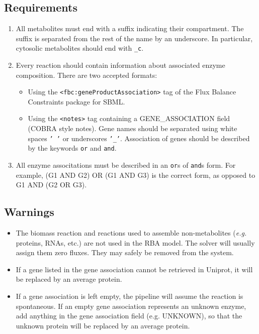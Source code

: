 \subsection{Requirements}
\begin{enumerate}
\item All metabolites must end with a suffix indicating their compartment.
The suffix is separated from the rest of the name by an underscore.
In particular, cytosolic metabolites should end with \texttt{\_c}.
\item Every reaction should contain information about associated enzyme composition.
There are two accepted formats:
  \begin{itemize}
  \item Using the \texttt{<fbc:geneProductAssociation>} tag of the Flux Balance Constraints package for SBML.
  \item Using the \texttt{<notes>} tag containing a GENE\_ASSOCIATION field (COBRA style notes).
  Gene names should be separated using white spaces \texttt{' '} or underscores \texttt{'\_'}.
  Association of genes should be described by the keywords \texttt{or} and \texttt{and}.
  \end{itemize}
\item All enzyme associtations must be described in an \texttt{or}s of \texttt{and}s form.
For example, (G1 AND G2) OR (G1 AND G3) is the correct form,
as opposed to G1 AND (G2 OR G3).
\end{enumerate}

\subsection{Warnings}
\begin{itemize}
\item The biomass reaction and reactions used to assemble non-metabolites
(\textit{e.g.} proteins, RNAs, etc.) are not used in the RBA model.
The solver will usually assign them zero fluxes.
They may safely be removed from the system.
\item If a gene listed in the gene association cannot be retrieved in Uniprot,
it will be replaced by an average protein.
\item If a gene association is left empty, the pipeline will assume the reaction is spontaneous.
If an empty gene association represents an unknown enzyme,
add anything in the gene association field (e.g. UNKNOWN),
so that the unknown protein will be replaced by an average protein.
\end{itemize}

